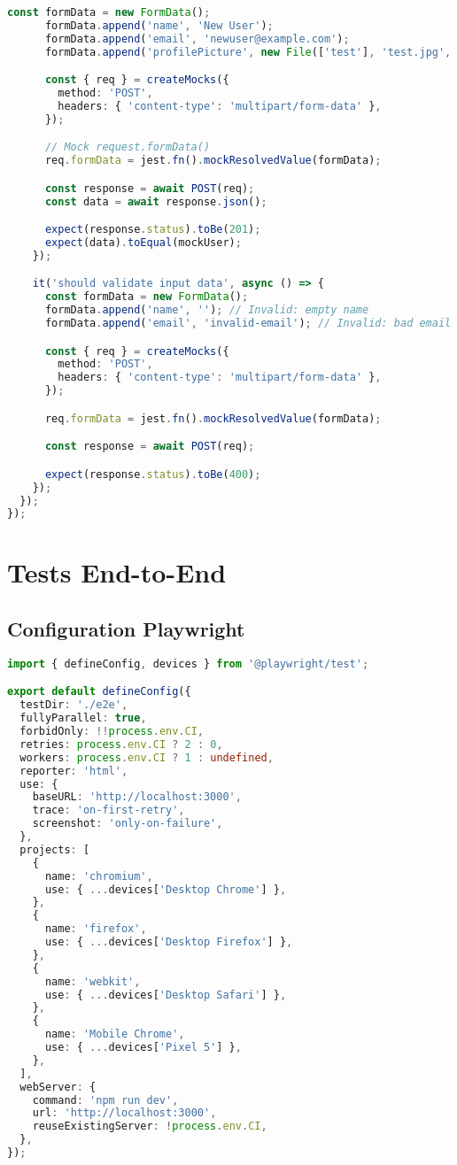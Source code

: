 \begin{lstlisting}[language=TypeScript, caption=Tests d'intégration API]
      const formData = new FormData();
      formData.append('name', 'New User');
      formData.append('email', 'newuser@example.com');
      formData.append('profilePicture', new File(['test'], 'test.jpg', { type: 'image/jpeg' }));

      const { req } = createMocks({
        method: 'POST',
        headers: { 'content-type': 'multipart/form-data' },
      });

      // Mock request.formData()
      req.formData = jest.fn().mockResolvedValue(formData);

      const response = await POST(req);
      const data = await response.json();

      expect(response.status).toBe(201);
      expect(data).toEqual(mockUser);
    });

    it('should validate input data', async () => {
      const formData = new FormData();
      formData.append('name', ''); // Invalid: empty name
      formData.append('email', 'invalid-email'); // Invalid: bad email format

      const { req } = createMocks({
        method: 'POST',
        headers: { 'content-type': 'multipart/form-data' },
      });

      req.formData = jest.fn().mockResolvedValue(formData);

      const response = await POST(req);

      expect(response.status).toBe(400);
    });
  });
});
\end{lstlisting}

\section{Tests End-to-End}

\subsection{Configuration Playwright}

\begin{lstlisting}[language=TypeScript, caption=Configuration Playwright]
import { defineConfig, devices } from '@playwright/test';

export default defineConfig({
  testDir: './e2e',
  fullyParallel: true,
  forbidOnly: !!process.env.CI,
  retries: process.env.CI ? 2 : 0,
  workers: process.env.CI ? 1 : undefined,
  reporter: 'html',
  use: {
    baseURL: 'http://localhost:3000',
    trace: 'on-first-retry',
    screenshot: 'only-on-failure',
  },
  projects: [
    {
      name: 'chromium',
      use: { ...devices['Desktop Chrome'] },
    },
    {
      name: 'firefox',
      use: { ...devices['Desktop Firefox'] },
    },
    {
      name: 'webkit',
      use: { ...devices['Desktop Safari'] },
    },
    {
      name: 'Mobile Chrome',
      use: { ...devices['Pixel 5'] },
    },
  ],
  webServer: {
    command: 'npm run dev',
    url: 'http://localhost:3000',
    reuseExistingServer: !process.env.CI,
  },
});
\end{lstlisting}

